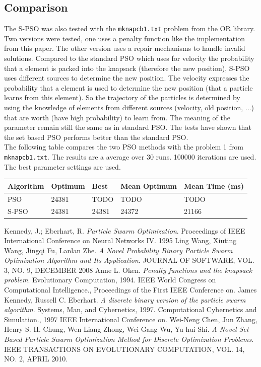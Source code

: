 \documentclass{article}
\begin{document}
\subsection{Comparison}
The S-PSO was also tested with the \lstinline$mknapcb1.txt$ problem from the OR library. Two versions were tested, one uses a penalty function like the implementation from this paper. The other version uses a repair mechanisms to handle invalid solutions. Compared to the standard PSO which uses for velocity the probability that a element is packed into the knapsack (therefore the new position), S-PSO uses different sources to determine the new position. The velocity expresses the probability that a element is used to determine the new position (that a particle learns from this element). So the trajectory of the particles is determined by using the knowledge of elements from different sources (velocity, old position, ...) that are worth (have high probability) to learn from. The meaning of the parameter remain still the same as in standard PSO. The tests have shown that the set based PSO performs better than the standard PSO.\\

The following table compares the two PSO methods with the problem 1 from \lstinline$mknapcb1.txt$. The results are a average over 30 runs. 100000 iterations are used. The best parameter settings are used. \\ 

\begin{tabular}{|l|l|l|l|l|}
	\hline
	Algorithm & Optimum & Best & Mean Optimum & Mean Time (ms) \\
	\hline
	PSO & 24381 & TODO & TODO & TODO \\ \hline
	S-PSO & 24381 & 24381 & 24372 & 21166 \\ \hline
\end{tabular}

\newpage

\begin{thebibliography}{99}
		Kennedy, J.; Eberhart, R.
		\emph{Particle Swarm Optimization}.
		Proceedings of IEEE International Conference on Neural Networks IV.
		1995
		Ling Wang, Xiuting Wang, Jingqi Fu, Lanlan Zhe.
	  	\emph{A Novel Probability Binary Particle Swarm Optimization Algorithm and Its Application}.
	  	JOURNAL OF SOFTWARE, VOL. 3, NO. 9, DECEMBER 2008
		Anne L. Oken.
		\emph{Penalty functions and the knapsack problem}.
		Evolutionary Computation, 1994. IEEE World Congress on Computational Intelligence., Proceedings of the First IEEE Conference on.
		James Kennedy, Russell C. Eberhart.
		\emph{A discrete binary version of the particle swarm algorithm}.
		Systems, Man, and Cybernetics, 1997. Computational Cybernetics and Simulation., 1997 IEEE International Conference on.
		Wei-Neng Chen, Jun Zhang, Henry S. H. Chung, Wen-Liang Zhong, Wei-Gang Wu, Yu-hui Shi.
		\emph{A Novel Set-Based Particle Swarm Optimization Method for Discrete Optimization Problems}.
		IEEE TRANSACTIONS ON EVOLUTIONARY COMPUTATION, VOL. 14, NO. 2, APRIL 2010.
\end{thebibliography}
\end{document}
